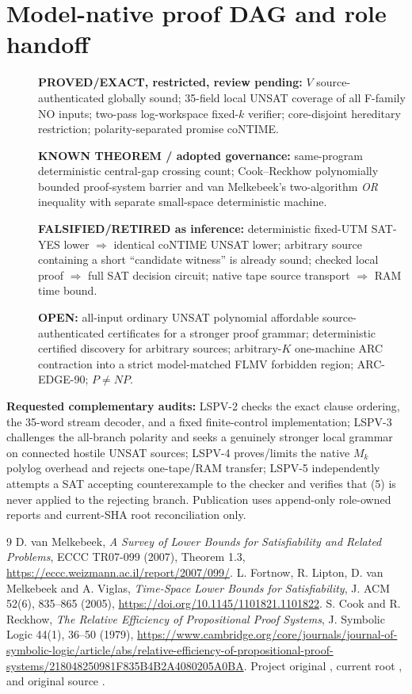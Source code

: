 \documentclass[11pt]{article}
\begin{document}
\section{Model-native proof DAG and role handoff}
\begin{description}
\item[]\textbf{PROVED/EXACT, restricted, review pending:} $V$ source-authenticated globally sound; 35-field local UNSAT coverage of all F-family NO inputs; two-pass log-workspace fixed-$k$ verifier; core-disjoint hereditary restriction; polarity-separated promise coNTIME.
\item[]\textbf{KNOWN THEOREM / adopted governance:} same-program deterministic central-gap crossing count; Cook--Reckhow polynomially bounded proof-system barrier and van Melkebeek's two-algorithm \emph{OR} inequality with separate small-space deterministic machine.
\item[]\textbf{FALSIFIED/RETIRED as inference:} deterministic fixed-UTM SAT-YES lower $\Rightarrow$ identical coNTIME UNSAT lower; arbitrary source containing a short ``candidate witness'' is already sound; checked local proof $\Rightarrow$ full SAT decision circuit; native tape source transport $\Rightarrow$ RAM time bound.
\item[]\textbf{OPEN:} all-input ordinary UNSAT polynomial affordable source-authenticated certificates for a stronger proof grammar; deterministic certified discovery for arbitrary sources; arbitrary-$K$ one-machine ARC contraction into a strict model-matched FLMV forbidden region; ARC-EDGE-90; $P\ne NP$.
\end{description}

\textbf{Requested complementary audits:} LSPV-2 checks the exact clause ordering, the 35-word stream decoder, and a fixed finite-control implementation; LSPV-3 challenges the all-branch polarity and seeks a genuinely stronger local grammar on connected hostile UNSAT sources; LSPV-4 proves/limits the native $M_k$ polylog overhead and rejects one-tape/RAM transfer; LSPV-5 independently attempts a SAT accepting counterexample to the checker and verifies that (5) is never applied to the rejecting branch. Publication uses append-only role-owned reports and current-SHA root reconciliation only.

\begin{thebibliography}{9}
 D. van Melkebeek, \emph{A Survey of Lower Bounds for Satisfiability and Related Problems}, ECCC TR07-099 (2007), Theorem 1.3, \url{https://eccc.weizmann.ac.il/report/2007/099/}.
 L. Fortnow, R. Lipton, D. van Melkebeek and A. Viglas, \emph{Time-Space Lower Bounds for Satisfiability}, J. ACM 52(6), 835--865 (2005), \url{https://doi.org/10.1145/1101821.1101822}.
 S. Cook and R. Reckhow, \emph{The Relative Efficiency of Propositional Proof Systems}, J. Symbolic Logic 44(1), 36--50 (1979), \url{https://www.cambridge.org/core/journals/journal-of-symbolic-logic/article/abs/relative-efficiency-of-propositional-proof-systems/218048250981F835B4B2A4080205A0BA}.
 Project original , current root , and original source .
\end{thebibliography}
\end{document}
